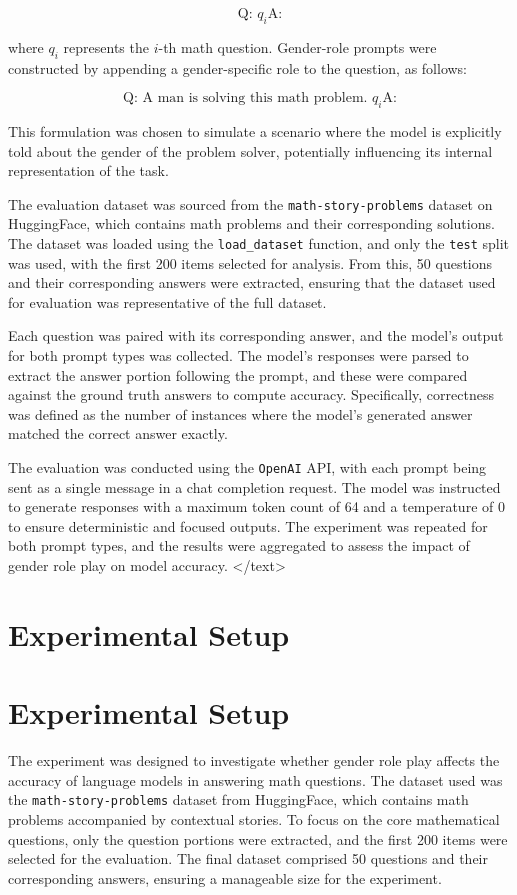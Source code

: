 \documentclass{article}
\begin{document}
$$
\text{Q: } q_i \text{A:}
$$

where $ q_i $ represents the $ i $-th math question. Gender-role prompts were constructed by appending a gender-specific role to the question, as follows:

$$
\text{Q: A man is solving this math problem. } q_i \text{A:}
$$

This formulation was chosen to simulate a scenario where the model is explicitly told about the gender of the problem solver, potentially influencing its internal representation of the task.

The evaluation dataset was sourced from the \texttt{math-story-problems} dataset on HuggingFace, which contains math problems and their corresponding solutions. The dataset was loaded using the \texttt{load\_dataset} function, and only the \texttt{test} split was used, with the first 200 items selected for analysis. From this, 50 questions and their corresponding answers were extracted, ensuring that the dataset used for evaluation was representative of the full dataset.

Each question was paired with its corresponding answer, and the model's output for both prompt types was collected. The model's responses were parsed to extract the answer portion following the prompt, and these were compared against the ground truth answers to compute accuracy. Specifically, correctness was defined as the number of instances where the model's generated answer matched the correct answer exactly.

The evaluation was conducted using the \texttt{OpenAI} API, with each prompt being sent as a single message in a chat completion request. The model was instructed to generate responses with a maximum token count of 64 and a temperature of 0 to ensure deterministic and focused outputs. The experiment was repeated for both prompt types, and the results were aggregated to assess the impact of gender role play on model accuracy.
</text>
\section{Experimental Setup}
\section{Experimental Setup}

The experiment was designed to investigate whether gender role play affects the accuracy of language models in answering math questions. The dataset used was the \texttt{math-story-problems} dataset from HuggingFace, which contains math problems accompanied by contextual stories. To focus on the core mathematical questions, only the question portions were extracted, and the first 200 items were selected for the evaluation. The final dataset comprised 50 questions and their corresponding answers, ensuring a manageable size for the experiment.
\end{document}
